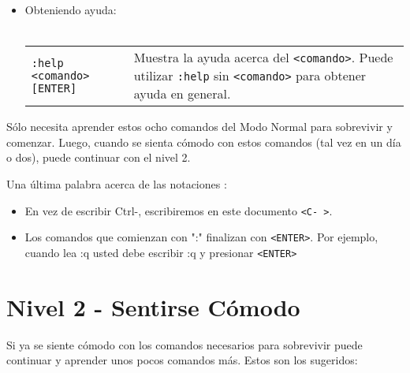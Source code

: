 \documentclass[12pt]{article}
\begin{document}
\begin{itemize}
	\item Obteniendo ayuda: \\ \\
\begin{tabular}{ l l }
	\texttt{:help <comando>[ENTER]}  & Muestra la ayuda acerca del \texttt{<comando>}. Puede utilizar \texttt{:help} sin \texttt{<comando>} para obtener ayuda en general. \\
\end{tabular}
\end{itemize}

Sólo necesita aprender estos ocho comandos del Modo Normal para sobrevivir y comenzar.
Luego, cuando se sienta cómodo con estos comandos (tal vez en un día o dos), puede continuar con el nivel 2.




Una última palabra acerca de las notaciones :

\begin{itemize}
	\item En vez de escribir Ctrl-, escribiremos en este documento \texttt{<C- >}.
	\item Los comandos que comienzan con ":" finalizan con \texttt{<ENTER>}. Por ejemplo,
cuando lea :q usted debe escribir :q y presionar \texttt{<ENTER>}
\end{itemize}


\section{Nivel 2 - Sentirse Cómodo}


Si ya se siente cómodo con los comandos necesarios para sobrevivir 
puede continuar y aprender unos pocos comandos más. Estos son los sugeridos:
\end{document}
